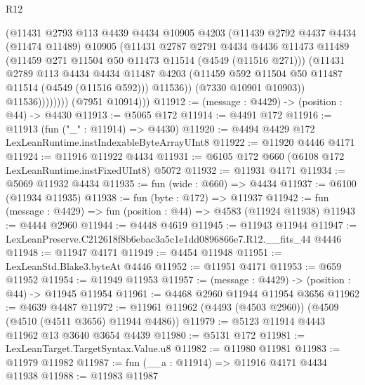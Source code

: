 \begin{lexlean}{R12}
\begin{coremodule}
                      (@11431
                        @2793
                        @113
                        @4439
                        @4434
                        @10905
                        @4203
                        (@11439
                          @2792
                          @4437
                          @4434
                          (@11474 @11489)
                          @10905
                          (@11431
                            @2787
                            @2791
                            @4434
                            @4436
                            @11473
                            @11489
                            (@11459 @271 @11504 @50 @11473 @11514 (@4549 (@11516 @271)))
                            (@11431
                              @2789
                              @113
                              @4434
                              @4434
                              @11487
                              @4203
                              (@11459 @592 @11504 @50 @11487 @11514 (@4549 (@11516 @592)))
                              @11536))
                          (@7330 @10901 @10903))
                        @11536))))))))
        (@7951 @10914)))
@11912 := (message : @4429) -> (position : @44) -> @4430
@11913 := @5065 @172
@11914 := @4491 @172
@11916 := @11913 (fun ("_" : @11914) => @4430)
@11920 := @4494 @4429 @172 LexLeanRuntime.instIndexableByteArrayUInt8
@11922 := @11920 @4446 @4171
@11924 := @11916 @11922 @4434
@11931 := @6105 @172 @660 (@6108 @172 LexLeanRuntime.instFixedUInt8) @5072
@11932 := @11931 @4171
@11934 := @5069 @11932 @4434
@11935 := fun (wide : @660) => @4434
@11937 := @6100 (@11934 @11935)
@11938 := fun (byte : @172) => @11937
@11942 := fun (message : @4429) => fun (position : @44) => @4583 (@11924 @11938)
@11943 := @4444 @2960
@11944 := @4448 @4619
@11945 := @11943 @11944
@11947 := LexLeanPreserve.C212618f8b6ebac3a5c1e1dd0896866e7.R12.__fits_44 @4446
@11948 := @11947 @4171
@11949 := @4454 @11948
@11951 := LexLeanStd.Blake3.byteAt @4446
@11952 := @11951 @4171
@11953 := @659 @11952
@11954 := @11949 @11953
@11957 := (message : @4429) -> (position : @44) -> @11945 @11954
@11961 := @4468 @2960 @11944 @11954 @3656
@11962 := @4639 @4487
@11972 := @11961 @11962 (@4493 (@4503 @2960)) (@4509 (@4510 (@4511 @3656) @11944 @4486))
@11979 := @5123 @11914 @4443 @11962 @13 @3640 @3654 @4439
@11980 := @5131 @172
@11981 := LexLeanTarget.TargetSyntax.Value.u8
@11982 := @11980 @11981
@11983 := @11979 @11982
@11987 := fun (__a : @11914) => @11916 @4171 @4434 @11938
@11988 := @11983 @11987

\end{coremodule}
\end{lexlean}
